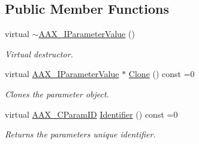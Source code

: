 \subsection*{Public Member Functions}
\begin{DoxyCompactItemize}
\item 
virtual \mbox{\hyperlink{a01853_a01435046395e84c47eef1e154b372823}{$\sim$\+A\+A\+X\+\_\+\+I\+Parameter\+Value}} ()
\begin{DoxyCompactList}\small\item\em Virtual destructor. \end{DoxyCompactList}\item 
virtual \mbox{\hyperlink{a01853}{A\+A\+X\+\_\+\+I\+Parameter\+Value}} $\ast$ \mbox{\hyperlink{a01853_a23ebf3322f5ded89954a5e220d2e717f}{Clone}} () const =0
\begin{DoxyCompactList}\small\item\em Clones the parameter object. \end{DoxyCompactList}\item 
virtual \mbox{\hyperlink{a00392_a1440c756fe5cb158b78193b2fc1780d1}{A\+A\+X\+\_\+\+C\+Param\+ID}} \mbox{\hyperlink{a01853_a5de1e79f1f0e7024f6f473d923b5dda2}{Identifier}} () const =0
\begin{DoxyCompactList}\small\item\em Returns the parameter\textquotesingle{}s unique identifier. \end{DoxyCompactList}\end{DoxyCompactItemize}
